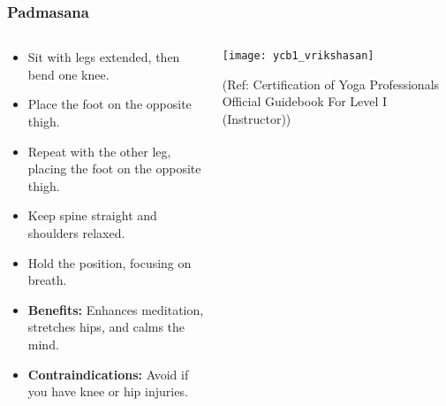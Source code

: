 \begin{frame}[fragile]\frametitle{Padmasana}
\begin{columns}
    \begin{column}[T]{0.5\linewidth}
      \begin{itemize}
        \item Sit with legs extended, then bend one knee.
        \item Place the foot on the opposite thigh.
        \item Repeat with the other leg, placing the foot on the opposite thigh.
        \item Keep spine straight and shoulders relaxed.
        \item Hold the position, focusing on breath.
        \item \textbf{Benefits:} Enhances meditation, stretches hips, and calms the mind.
        \item \textbf{Contraindications:} Avoid if you have knee or hip injuries.
      \end{itemize}
    \end{column}
    \begin{column}[T]{0.5\linewidth}
        \begin{center}
        \begin{center}
		        \texttt{[image: ycb1\_vrikshasan]}
				
				{\tiny (Ref: Certification  of Yoga Professionals Official Guidebook For Level I (Instructor))}	        
		\end{center}   
        \end{center}    
    \end{column}
  \end{columns}
\end{frame}

